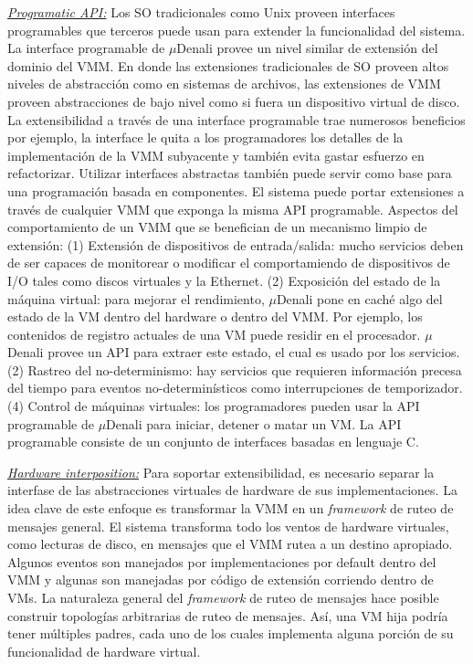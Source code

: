 \underline{\emph{Programatic API:}} Los SO tradicionales como Unix proveen interfaces programables que terceros puede usan para extender la funcionalidad del sistema. La interface programable de $\mu$Denali provee un nivel similar de extensión del dominio del VMM. En donde las extensiones tradicionales de SO proveen altos niveles de abstracción como en sistemas de archivos, las extensiones de VMM proveen abstracciones de bajo nivel como si fuera un dispositivo virtual de disco. La extensibilidad a través de una interface programable trae numerosos beneficios por ejemplo, la interface le quita a los programadores los detalles de la implementación de la VMM subyacente y también evita gastar esfuerzo en refactorizar. Utilizar interfaces abstractas también puede servir como base para una programación basada en componentes. El sistema puede portar extensiones a través de cualquier VMM que exponga la misma API programable. Aspectos del comportamiento de un VMM que se benefician de un mecanismo limpio de extensión: (1) Extensión de dispositivos de entrada/salida: mucho servicios deben de ser capaces de monitorear o modificar el comportamiendo de dispositivos de I/O tales como discos virtuales y la Ethernet. (2) Exposición del estado de la máquina virtual: para mejorar el rendimiento, $\mu$Denali pone en caché algo del estado de la VM dentro del hardware o dentro del VMM. Por ejemplo, los contenidos de registro actuales de una VM puede residir en el procesador. $\mu$Denali provee un API para extraer este estado, el cual es usado por los servicios. (2) Rastreo del no-determinismo: hay servicios que requieren información precesa del tiempo para eventos no-determinísticos como interrupciones de temporizador. (4) Control de máquinas virtuales: los programadores pueden usar la API programable de $\mu$Denali para iniciar, detener o matar un VM. La API programable consiste de un conjunto de interfaces basadas en lenguaje C. 

\underline{\emph{Hardware interposition:}} Para soportar extensibilidad, es necesario separar la interfase de las abstracciones virtuales de hardware de sus implementaciones. La idea clave de este enfoque es transformar la VMM en un \emph{framework} de ruteo de mensajes general. El sistema transforma todo los ventos de hardware virtuales, como lecturas de disco, en mensajes que el VMM rutea a un destino apropiado. Algunos eventos son manejados por implementaciones por default dentro del VMM y algunas son manejadas por código de extensión corriendo dentro de VMs. La naturaleza general del \emph{framework} de ruteo de mensajes hace posible construir topologías arbitrarias de ruteo de mensajes. Así, una VM hija podría tener múltiples padres, cada uno de los cuales implementa alguna porción de su funcionalidad de hardware virtual. 

